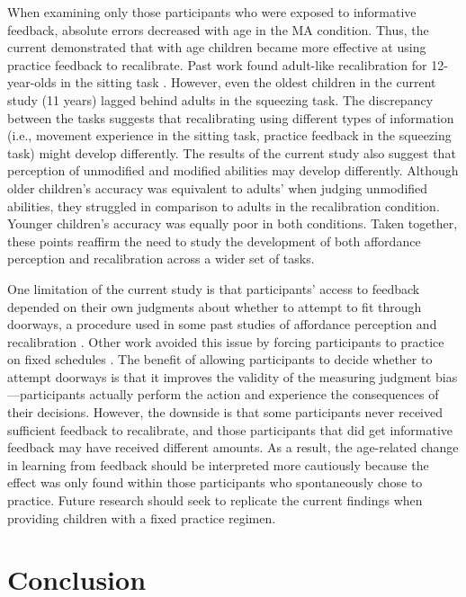 \documentclass[a4paper,man,natbib,floatsintext,noextraspace]{apa6}
\begin{document}
When examining only those participants who were exposed to informative feedback, absolute errors decreased with age in the MA condition. Thus, the current demonstrated that with age children became more effective at using practice feedback to recalibrate. Past work found adult-like recalibration for 12-year-olds in the sitting task \citep{ChenRecal}. However, even the oldest children in the current study (11 years) lagged behind adults in the squeezing task. The discrepancy between the tasks suggests that recalibrating using different types of information (i.e., movement experience in the sitting task, practice feedback in the squeezing task) might develop differently. The results of the current study also suggest that perception of unmodified and modified abilities may develop differently. Although older children's accuracy was equivalent to adults' when judging unmodified abilities, they struggled in comparison to adults in the recalibration condition. Younger children's accuracy was equally poor in both conditions. Taken together, these points reaffirm the need to study the development of both affordance perception and recalibration across a wider set of tasks. 

One limitation of the current study is that participants' access to feedback depended on their own judgments about whether to attempt to fit through doorways, a procedure used in some past studies of affordance perception and recalibration \citep{PregAps, ChildReaching}. Other work avoided this issue by forcing participants to practice on fixed schedules \citep{DoorwayLearning, Recal}. The benefit of allowing participants to decide whether to attempt doorways is that it improves the validity of the measuring judgment bias---participants actually perform the action and experience the consequences of their decisions. However, the downside is that some participants never received sufficient feedback to recalibrate, and those participants that did get informative feedback may have received different amounts. As a result, the age-related change in learning from feedback should be interpreted more cautiously because the effect was only found within those participants who spontaneously chose to practice. Future research should seek to replicate the current findings when providing children with a fixed practice regimen.

\section{Conclusion}
\end{document}
